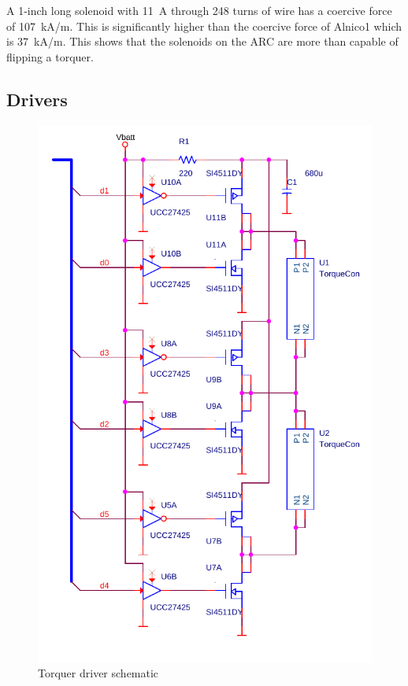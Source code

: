 
A 1-inch long solenoid with 11~A through 248 turns of wire has a coercive force of 107~kA/m. This is significantly higher than the coercive force of Alnico1 which is 37~kA/m\cite{AlnicoProp}. This shows that the solenoids on the \ac{ARC} are more than capable of flipping a torquer.

\subsection{Drivers}

\begin{figure}[htb!]
    \centering
    \includegraphics[height=0.5\textheight]{Figures/driverSchematic}
    \caption{Torquer driver schematic}
    \label{fig:drive}
\end{figure}

